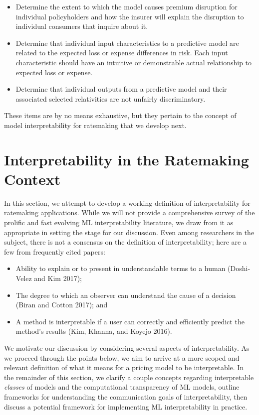 \documentclass[preprint, 3p, twocolumn, letterpaper, 10pt]{elsarticle} %
\providecommand{\tightlist}{%
  \setlength{\itemsep}{0pt}\setlength{\parskip}{0pt}}
\begin{document}
\begin{itemize}
\tightlist
\item
  Determine the extent to which the model causes premium disruption for individual
  policyholders and how the insurer will
  explain the disruption to individual consumers that inquire about it.
\item
  Determine that individual input characteristics to a predictive model are
  related to the expected loss or expense
  differences in risk. Each input characteristic should have an intuitive or
  demonstrable actual relationship to expected loss or expense.
\item
  Determine that individual outputs from a predictive model and their associated
  selected relativities are not unfairly discriminatory.
\end{itemize}

These items are by no means exhaustive, but they pertain to the concept of model
interpretability for ratemaking that we develop next.

\hypertarget{interpretability}{%
\section{Interpretability in the Ratemaking Context}\label{interpretability}}

In this section, we attempt to develop a working definition of interpretability
for ratemaking applications. While we will not provide a comprehensive survey of
the prolific and fast evolving ML interpretability literature, we draw from it
as appropriate in setting the stage for our discussion. Even among researchers
in the subject, there is not a consensus on the definition of interpretability;
here are a few from frequently cited papers:

\begin{itemize}
\tightlist
\item
  Ability to explain or to present in understandable terms to a human
  (Doshi-Velez and Kim 2017);
\item
  The degree to which an observer can understand the cause of a decision
  (Biran and Cotton 2017); and
\item
  A method is interpretable if a user can correctly and efficiently predict the
  method's results (Kim, Khanna, and Koyejo 2016).
\end{itemize}

We motivate our discussion by considering several aspects of interpretability.
As we proceed through the points below, we aim to arrive at a more scoped and
relevant definition of what it means for a pricing
model to be interpretable. In the remainder of this section, we clarify a couple concepts regarding
interpretable \emph{classes} of models and the computational transparency of ML
models, outline frameworks for understanding the communication goals of interpretability,
then discuss a potential framework for implementing ML
interpretability in practice.
\end{document}
